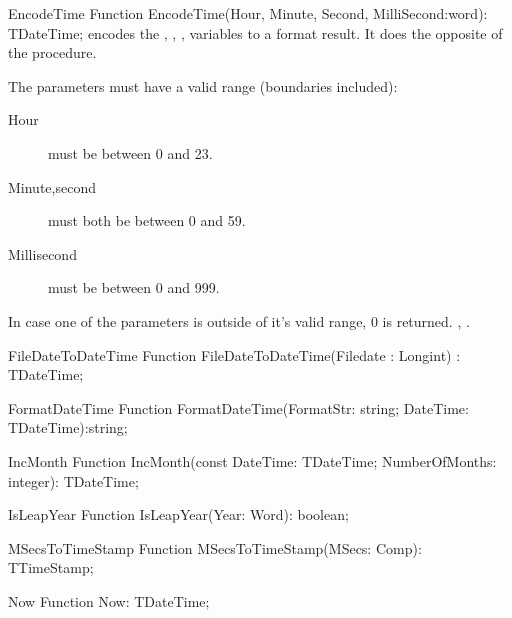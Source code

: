 \begin{function}{EncodeTime}
\Declaration
Function EncodeTime(Hour, Minute, Second, MilliSecond:word): TDateTime;
\Description
{} encodes the , , ,
 variables to a  format result.
It does the opposite of the  procedure.

The parameters must have a valid range (boundaries included):
\begin{description}
\item[Hour] must be between 0 and 23.
\item[Minute,second] must both be between 0 and 59.
\item[Millisecond] must be between 0 and 999.
\end{description}
\Errors
In case one of the parameters is outside of it's valid range, 0 is returned.
\SeeAlso
{}, .
\end{function}

\html{}

 
\begin{function}{FileDateToDateTime}
\Declaration
Function FileDateToDateTime(Filedate : Longint) : TDateTime;
\Description
\Errors
\SeeAlso
\end{function}

 
\begin{function}{FormatDateTime}
\Declaration
Function FormatDateTime(FormatStr: string; DateTime: TDateTime):string;
\Description
\Errors
\SeeAlso
\end{function}

 
\begin{function}{IncMonth}
\Declaration
Function IncMonth(const DateTime: TDateTime; NumberOfMonths: integer): TDateTime;
\Description
\Errors
\SeeAlso
\end{function}

 
\begin{function}{IsLeapYear}
\Declaration
Function IsLeapYear(Year: Word): boolean;
\Description
\Errors
\SeeAlso
\end{function}

 
\begin{function}{MSecsToTimeStamp}
\Declaration
Function MSecsToTimeStamp(MSecs: Comp): TTimeStamp;
\Description
\Errors
\SeeAlso
\end{function}

 
\begin{function}{Now}
\Declaration
Function Now: TDateTime;
\Description
\Errors
\SeeAlso
\end{function}

